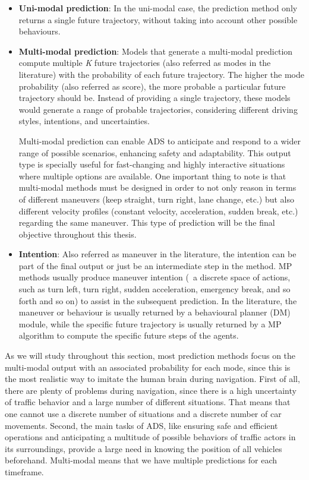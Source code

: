 \begin{itemize}
	
	\item \textbf{Uni-modal prediction}: In the uni-modal case, the prediction method only returns a single future trajectory, without taking into account other possible behaviours. 
	
	\item \textbf{Multi-modal prediction}: Models that generate a multi-modal prediction compute multiple \textit{K} future trajectories (also referred as modes in the literature) with the probability of each future trajectory. The higher the mode probability (also referred as score), the more probable a particular future trajectory should be. Instead of providing a single trajectory, these models would generate a range of probable trajectories, considering different driving styles, intentions, and uncertainties. 
	
	Multi-modal prediction can enable \ac{ADS} to anticipate and respond to a wider range of possible scenarios, enhancing safety and adaptability. This output type is specially useful for fast-changing and highly interactive situations where multiple options are available. One important thing to note is that multi-modal methods must be designed in order to not only reason in terms of different maneuvers (keep straight, turn right, lane change, etc.) but also different velocity profiles (constant velocity, acceleration, sudden break, etc.) regarding the same maneuver. This type of prediction will be the final objective throughout this thesis.
	
	\item \textbf{Intention}: Also referred as maneuver in the literature, the intention can be part of the final output or just be an intermediate step in the method. \ac{MP} methods usually produce maneuver intention (\ie \ a discrete space of actions, such as turn left, turn right, sudden acceleration, emergency break, and so forth and so on) to assist in the subsequent prediction. In the literature, the maneuver or behaviour is usually returned by a behavioural planner (\ac{DM}) module, while the specific future trajectory is usually returned by a \ac{MP} algorithm to compute the specific future steps of the agents.
\end{itemize}

As we will study throughout this section, most prediction methods focus on the multi-modal output with an associated probability for each mode, since this is the most realistic way to imitate the human brain during navigation. First of all, there are plenty of problems during navigation, since there is a high uncertainty of traffic behavior and a large number of different situations. That means that one cannot use a discrete number of situations and a discrete number of car movements. Second, the main tasks of \ac{ADS}, like ensuring safe and efficient operations and anticipating a multitude of possible behaviors of traffic actors in its surroundings, provide a large need in knowing the position of all vehicles beforehand. Multi-modal means that we have multiple predictions for each timeframe. 

